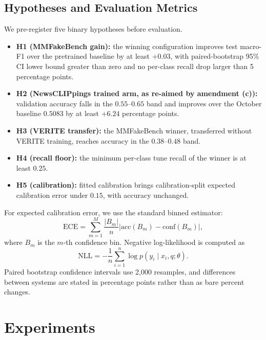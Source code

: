 \documentclass{article} %
\begin{document}
\subsection{Hypotheses and Evaluation Metrics}
We pre-register five binary hypotheses before evaluation.
\begin{itemize}
    \item \textbf{H1 (MMFakeBench gain):} the winning configuration improves test macro-F1 over the pretrained baseline by at least \(+0.03\), with paired-bootstrap 95\% CI lower bound greater than zero and no per-class recall drop larger than 5 percentage points.
    \item \textbf{H2 (NewsCLIPpings trained arm, as re-aimed by amendment (c)):} validation accuracy falls in the \(0.55\)--\(0.65\) band and improves over the October baseline \(0.5083\) by at least \(+6.24\) percentage points.
    \item \textbf{H3 (VERITE transfer):} the MMFakeBench winner, transferred without VERITE training, reaches accuracy in the \(0.38\)--\(0.48\) band.
    \item \textbf{H4 (recall floor):} the minimum per-class tune recall of the winner is at least \(0.25\).
    \item \textbf{H5 (calibration):} fitted calibration brings calibration-split expected calibration error under \(0.15\), with accuracy unchanged.
\end{itemize}

For expected calibration error, we use the standard binned estimator:
\[
\mathrm{ECE}
=
\sum_{m=1}^{M}
\frac{|B_m|}{n}
\left|
\mathrm{acc}(B_m)
-
\mathrm{conf}(B_m)
\right|,
\]
where \(B_m\) is the \(m\)-th confidence bin. Negative log-likelihood is computed as
\[
\mathrm{NLL}
=
-\frac{1}{n}
\sum_{i=1}^n
\log p(y_i\mid x_i,q;\theta).
\]
Paired bootstrap confidence intervals use 2,000 resamples, and differences between systems are stated in percentage points rather than as bare percent changes.

\section{Experiments}
\label{sec:experiments}
\end{document}
